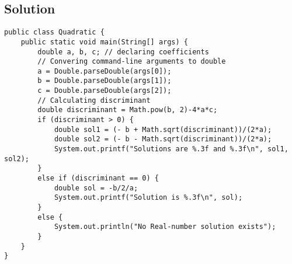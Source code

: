 \subsection*{Solution}
\lstset{language=Java,tabsize=2}
\begin{lstlisting}
public class Quadratic {
	public static void main(String[] args) {
		double a, b, c; // declaring coefficients
		// Convering command-line arguments to double
		a = Double.parseDouble(args[0]);
		b = Double.parseDouble(args[1]);
		c = Double.parseDouble(args[2]);
		// Calculating discriminant
		double discriminant = Math.pow(b, 2)-4*a*c;
		if (discriminant > 0) {
			double sol1 = (- b + Math.sqrt(discriminant))/(2*a);
			double sol2 = (- b - Math.sqrt(discriminant))/(2*a);
			System.out.printf("Solutions are %.3f and %.3f\n", sol1, sol2);
		}
		else if (discriminant == 0) {
			double sol = -b/2/a;
			System.out.printf("Solution is %.3f\n", sol);
		}
		else {
			System.out.println("No Real-number solution exists");
		}
	}
}
\end{lstlisting}
